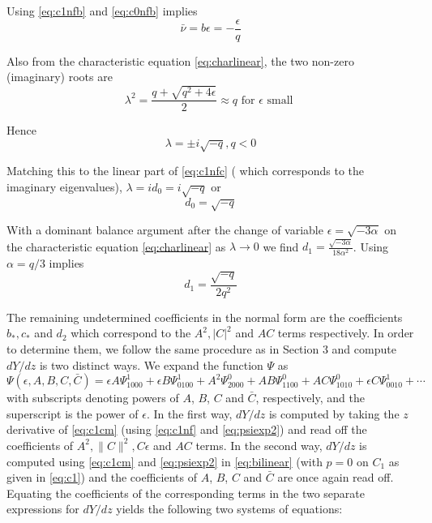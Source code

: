 Using \eqref{eq:c1nfb} and \eqref{eq:c0nfb} implies
\begin{equation}
\bar{\nu} = b \epsilon = -\frac{\epsilon}{q} 
\end{equation}

Also from the characteristic equation \eqref{eq:charlinear}, the two non-zero 
(imaginary) roots are 
\begin{equation}
\lambda^2 = \frac{ q + \sqrt{q^2 + 4 \epsilon } }{2} \approx q \textrm{ for } \epsilon \textrm{ small }
\end{equation}

Hence
\begin{equation}
\lambda = \pm i \sqrt{-q}, q < 0
\end{equation}

Matching this to the linear part of \eqref{eq:c1nfc} ( which corresponds to the imaginary eigenvalues), $\lambda = i d_0 = i \sqrt{-q}$ or 
\begin{equation}
d_0 = \sqrt{-q}
\end{equation}


With a  dominant balance argument after the change of variable $\epsilon = \sqrt{-3 \alpha}$ on the characteristic equation 
\eqref{eq:charlinear} as $\lambda \rightarrow 0 $ 
we find $ d_1 = \frac{ \sqrt{-3 \alpha} }{18 \alpha^2 } $. 
Using $\alpha=q/3$ implies 
\begin{equation}
d_1 = \frac{\sqrt{-q}}{2 q^2} 
\end{equation}

The remaining undetermined coefficients  in the normal form are the
coefficients $b_*,c_*$ and $d_2$ which correspond to the $A^2, |C|^2$ and $AC$
terms respectively. In order to determine them, we follow the same procedure as
in Section 3 and compute $dY/dz$ is two distinct ways. We expand the function
$\Psi$ as
\begin{equation}\label{eq:psiexp2}
\Psi(\epsilon,A,B,C,\bar{C}) = \epsilon A \Psi_{1000}^1 + \epsilon B \Psi_{0100}^1 + A^2 \Psi_{2000}^0 + A B \Psi_{1100}^0 + A C \Psi_{1010}^0 + \epsilon C \Psi_{0010}^1 + \cdots 
\end{equation}
with subscripts denoting powers of $A$, $B$, $C$ and $\bar{C}$, respectively,
and the superscript is the power of $\epsilon$. In the first way, $dY/dz$ is
computed by taking the $z$ derivative of \eqref{eq:c1cm} (using \eqref{eq:c1nf}
and \eqref{eq:psiexp2}) and read off the coefficients of $A^2, \|C\|^2, C
\epsilon$ and $AC$ terms.  In the second way, $dY/dz$ is computed using
\eqref{eq:c1cm} and \eqref{eq:psiexp2} in \eqref{eq:bilinear} (with $p=0$ on
$C_1$ as given in \eqref{eq:c1}) and the coefficients of  $A$, $B$, $C$ and
$\bar{C}$ are once again read off.  Equating the coefficients of the
corresponding terms in the two separate expressions for $dY/dz$ yields the
following two systems of equations:

